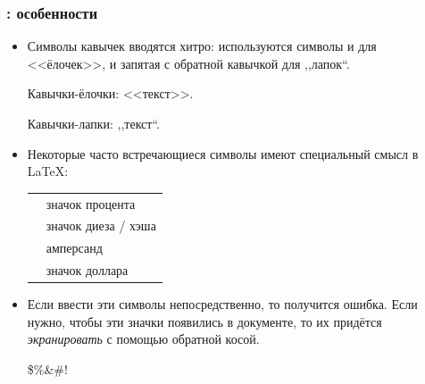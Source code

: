 \documentclass{beamer}
\begin{document}
\begin{frame}[fragile]
\frametitle{\insertsubsection{}: особенности}
\vspace{-3ex}
\small
\begin{itemize}
\item Символы кавычек вводятся хитро: используются символы \keystroke{<} и
  \keystroke{>} для <<ёлочек>>, и запятая \keystroke{,} с обратной кавычкой
   для ,,лапок``.
\begin{exampletwouptiny}
Кавычки-ёлочки: <<текст>>.

Кавычки-лапки: ,,текст``.
\end{exampletwouptiny}
\item Некоторые часто встречающиеся символы имеют специальный смысл в \LaTeX:

\begin{tabular}{cl}
\keystrokebftt{\%} & значок процента     \\
\keystrokebftt{\#} & значок диеза / хэша \\
\keystrokebftt{\&} & амперсанд           \\
\keystrokebftt{\$} & значок доллара      \\
\end{tabular}
\item Если ввести эти символы непосредственно, то получится ошибка. Если
  нужно, чтобы эти значки появились в документе, то их придётся \emph{экранировать}
  с помощью обратной косой.
\begin{exampletwoup}
\$\%\&\#!
\end{exampletwoup}
\end{itemize}
\end{frame}
\end{document}
